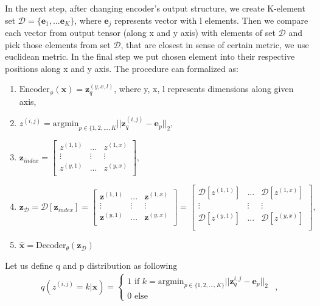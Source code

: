 \documentclass[10pt]{article}
\begin{document}
In the next step, after changing  encoder's output structure, we create K-element set $ \mathcal{D} = \{\textbf{e}_1, ... \textbf{e}_{K}\}$, where  $\textbf{e}_j$ represents vector with l elements. Then we compare each vector from output tensor (along x and y axis) with elements of set $ \mathcal{D}$ and pick those elements from set $\mathcal{D}$, that are closest in sense of certain metric, we use euclidean metric. In the final step we put chosen element into their respective positions along x and y axis. The procedure can formalized as:
\begin{enumerate}
    \item $ \text{Encoder}_{\phi}(\textbf{x})  = \textbf{z}_q^{(y, x, l)}$, where y, x, l represents dimensions along given axis,
    \item $z^{(i,j)} = \text{argmin}_{p \in \{1, 2, ..., K}||\textbf{z}_q^{(i, j)} - \textbf{e}_p ||_2, $
    \item $ \textbf{z}_{index} = 
        \begin{bmatrix}
        z^{(1,1)} &...&  z^{(1,x)} \\
        \vdots  & \vdots   & \vdots \\
         z^{(y,1)} &...& z^{(y,x)} \\
    \end{bmatrix}, 
    $
    \item $\textbf{z}_\mathcal{D} =  \mathcal{D}[\textbf{z}_{index}] = 
    \begin{bmatrix}
        \textbf{z}^{(1,1)} &...& \textbf{z}^{(1,x)} \\
        \vdots  & \vdots   & \vdots \\
        \textbf{z}^{(y,1)} &...&\textbf{z}^{(y,x)} \\
    \end{bmatrix} =
    \begin{bmatrix}
        \mathcal{D}[z^{(1,1)}] &...&  \mathcal{D}[z^{(1,x)}] \\
        \vdots  & \vdots   & \vdots \\
         \mathcal{D}[z^{(y,1)}] &...& \mathcal{D}[z^{(y,x)}] \\
    \end{bmatrix}, $
    \item  $\hat{\textbf{x}} = \text{Decoder}_{\theta}(\textbf{z}_\mathcal{D}) $
\end{enumerate}
Let us define q and p distribution as following 
\begin{equation} \label{eq:vq_elem_prior}
\begin{gathered}
    q( z^{(i,j)} = k | \textbf{x}) =  
    \begin{cases}
    1 \text{ if }  k = \text{argmin}_{p \in \{1, 2, ..., K\}}||\textbf{z}_q^{i, j} - \textbf{e}_p ||_2 \\
    0 \text{ else}
    \end{cases}
\end{gathered}
,
\end{equation}
\end{document}
